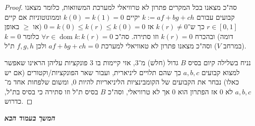 \documentclass[]{article}
\newcommand\npage {\vfil {\hfil \textbf{\textit{המשך בעמוד הבא}}} \hfil \vfil \pagebreak}
\DeclareMathOperator\dom   {dom}
\newcommand\co        {\colon}
\begin{document}
\begin{proof}
		סה"כ מצאנו בכל המקרים פתרון לא טרוויאלי למערכת המשוואות, כלומר מצאנו קבועים עבורם $k:= af + bg + ch$ יקיים $k(0) = k(1) =  0$ וממונוטוניות אם קיים $r \in [0, 1]$ כך ש־$k(r) \neq 0$ אז $0 = k(0) \le k(r) \le k(0) = 0$ (או $\ge$ באופן דומה) ובהכרח $k(r) = 0$ וזו סתירה. סה"כ $\forall r \in \dom k \co k(r) = 0$ כלומר $k = 0$ (במרחב $V$) וסה"כ מצאנו פתרון לא טאוויאלי למערכת $af + bg + ch = 0$ ולכן $f, g, h$ ת"ל. 
		
		נניח בשלילה קיום בסיס $B$ גדול (חלש) מ־$3$, אזי קיימות בו $3$ פונקציות עליהן הראינו שאפשר למצוא קבועים $a, b, c$ כך שהם תלויים ליניארית, ועבור שאר הפונקציות/וקטורים (אם יש כאלו) נבחר את הקבועים של הקומבינציות הליניאריות להיות $0$, ומשום שלפחות אחד מ־$a, b, c$ לא $0$ אז הפתרון הוא $0$ אך לא טרוויאלי, וסה"כ $B$ בסיס ת"ל וזו סתירה כי בסיס בת"ל, כדרוש. 
	\end{proof}
	
	\npage
	
	\section{}
	
\end{document}
